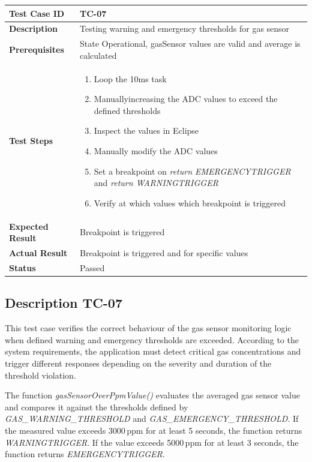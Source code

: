 \begin{table}[h]
\centering
\begin{tabular}{|p{}|p{}|}
\hline
\textbf{Test Case ID} & TC-07 \\ \hline
\textbf{Description} &  Testing warning and emergency thresholds for gas sensor \\ \hline
\textbf{Prerequisites} & State Operational, gasSensor values are valid and average is calculated \\ \hline
\textbf{Test Steps} &
\begin{enumerate}
\item Loop the 10ms task
\item Manuallyincreasing the ADC values to exceed the defined thresholds
\item Inspect the values in Eclipse
\item Manually modify the ADC values
\item Set a breakpoint on \textit{return EMERGENCYTRIGGER} and \textit{return WARNINGTRIGGER}
\item Verify at which values which breakpoint is triggered
\end{enumerate}
\\ \hline
\textbf{Expected Result} & Breakpoint is triggered \\ \hline
\textbf{Actual Result} & Breakpoint is triggered and for specific values \\ \hline
\textbf{Status} & \textcolor{green!60!black}{Passed} \\ \hline
\end{tabular}
\end{table}
\newpage
\subsection{Description TC-07}
This test case verifies the correct behaviour of the gas sensor monitoring logic when defined
warning and emergency thresholds are exceeded. According to the system requirements, the
application must detect critical gas concentrations and trigger different responses depending
on the severity and duration of the threshold violation.

The function \textit{gasSensorOverPpmValue()} evaluates the averaged gas sensor value and
compares it against the thresholds defined by \textit{GAS\_WARNING\_THRESHOLD} and
\textit{GAS\_EMERGENCY\_THRESHOLD}. If the measured value exceeds 3000\,ppm for at least
5 seconds, the function returns \textit{WARNINGTRIGGER}. If the value exceeds 5000\,ppm
for at least 3 seconds, the function returns \textit{EMERGENCYTRIGGER}.

